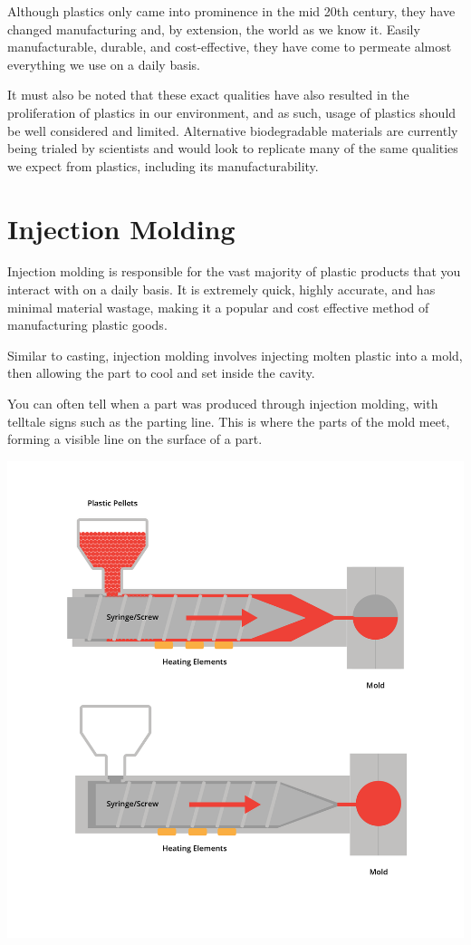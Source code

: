 Although plastics only came into prominence in the mid 20th century, they have changed manufacturing and, by extension, the world as we know it. Easily manufacturable, durable, and cost-effective, they have come to permeate almost everything we use on a daily basis.

It must also be noted that these exact qualities have also resulted in the proliferation of plastics in our environment, and as such, usage of plastics should be well considered and limited. Alternative biodegradable materials are currently being trialed by scientists and would look to replicate many of the same qualities we expect from plastics, including its manufacturability.

\section{Injection Molding}

Injection molding is responsible for the vast majority of plastic products that you interact with on a daily basis. It is extremely quick, highly accurate, and has minimal material wastage, making it a popular and cost effective method of manufacturing plastic goods.

Similar to casting, injection molding involves injecting molten plastic into a mold, then allowing the part to cool and set inside the cavity. 

You can often tell when a part was produced through injection molding, with telltale signs such as the parting line. This is where the parts of the mold meet, forming a visible line on the surface of a part.

\includegraphics[width=.75\textwidth]{injectionMolding.png}



